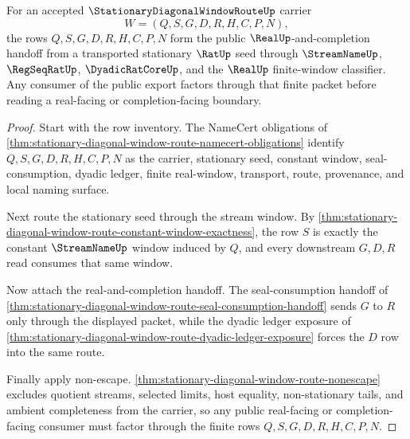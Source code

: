 \begin{theorem}
\label{thm:stationary-diagonal-window-route-public-export}
For an accepted $\StationaryDiagonalWindowRouteUp$ carrier
$$
W=(Q,S,G,D,R,H,C,P,N),
$$
the rows $Q,S,G,D,R,H,C,P,N$ form the public $\RealUp$-and-completion handoff from a transported stationary $\RatUp$ seed through $\StreamNameUp$, $\RegSeqRatUp$, $\DyadicRatCoreUp$, and the $\RealUp$ finite-window classifier. Any consumer of the public export factors through that finite packet before reading a real-facing or completion-facing boundary.
\end{theorem}
\begin{proof}
Start with the row inventory. The NameCert obligations of \autoref{thm:stationary-diagonal-window-route-namecert-obligations} identify $Q,S,G,D,R,H,C,P,N$ as the carrier, stationary seed, constant window, seal-consumption, dyadic ledger, finite real-window, transport, route, provenance, and local naming surface.

Next route the stationary seed through the stream window. By \autoref{thm:stationary-diagonal-window-route-constant-window-exactness}, the row $S$ is exactly the constant $\StreamNameUp$ window induced by $Q$, and every downstream $G,D,R$ read consumes that same window.

Now attach the real-and-completion handoff. The seal-consumption handoff of \autoref{thm:stationary-diagonal-window-route-seal-consumption-handoff} sends $G$ to $R$ only through the displayed packet, while the dyadic ledger exposure of \autoref{thm:stationary-diagonal-window-route-dyadic-ledger-exposure} forces the $D$ row into the same route.

Finally apply non-escape. \autoref{thm:stationary-diagonal-window-route-nonescape} excludes quotient streams, selected limits, host equality, non-stationary tails, and ambient completeness from the carrier, so any public real-facing or completion-facing consumer must factor through the finite rows $Q,S,G,D,R,H,C,P,N$.
\end{proof}

